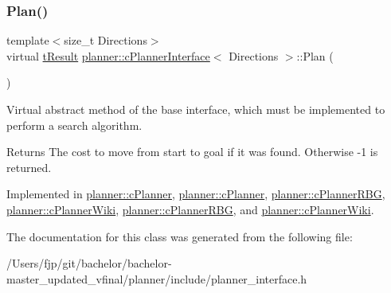 \mbox{\label{classplanner_1_1c_planner_interface_a7a06632a8c53906daf39611d9692ffa5}} 
\subsubsection{\texorpdfstring{Plan()}{Plan()}\hspace{0.1cm}{\footnotesize\ttfamily [2/2]}}
{\footnotesize\ttfamily template$<$size\+\_\+t Directions$>$ \\
virtual \mbox{\hyperlink{structt_result}{t\+Result}} \mbox{\hyperlink{classplanner_1_1c_planner_interface}{planner\+::c\+Planner\+Interface}}$<$ Directions $>$\+::Plan (\begin{DoxyParamCaption}{ }\end{DoxyParamCaption})\hspace{0.3cm}{\ttfamily [pure virtual]}}



Virtual abstract method of the base interface, which must be implemented to perform a search algorithm. 

\begin{DoxyReturn}{Returns}
The cost to move from start to goal if it was found. Otherwise -\/1 is returned. 
\end{DoxyReturn}


Implemented in \mbox{\hyperlink{classplanner_1_1c_planner_a21230c015260b9fc34ad2f239592470e}{planner\+::c\+Planner}}, \mbox{\hyperlink{classplanner_1_1c_planner_a21230c015260b9fc34ad2f239592470e}{planner\+::c\+Planner}}, \mbox{\hyperlink{classplanner_1_1c_planner_r_b_g_a0bbd752702da582a47dbd153c0065eb5}{planner\+::c\+Planner\+R\+BG}}, \mbox{\hyperlink{classplanner_1_1c_planner_wiki_a9d18be721400b51162ff463ab11d1721}{planner\+::c\+Planner\+Wiki}}, \mbox{\hyperlink{classplanner_1_1c_planner_r_b_g_a0bbd752702da582a47dbd153c0065eb5}{planner\+::c\+Planner\+R\+BG}}, and \mbox{\hyperlink{classplanner_1_1c_planner_wiki_a9d18be721400b51162ff463ab11d1721}{planner\+::c\+Planner\+Wiki}}.



The documentation for this class was generated from the following file\+:\begin{DoxyCompactItemize}
\item 
/\+Users/fjp/git/bachelor/bachelor-\/master\+\_\+updated\+\_\+vfinal/planner/include/planner\+\_\+interface.\+h\end{DoxyCompactItemize}
